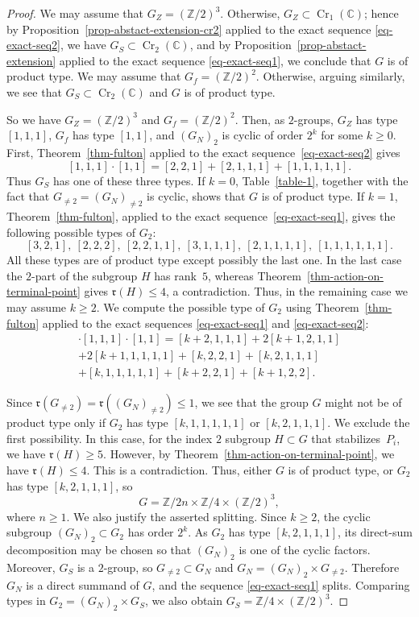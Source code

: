 \documentclass[11pt]{amsart}
\numberwithin{equation}{section}
\theoremstyle{definition}
\theoremstyle{remark}
\DeclareMathOperator{\Cr}{Cr}
\begin{document}
\begin{proof}
We may assume that $G_Z=(\mathbb{Z}/2)^3$. Otherwise, $G_Z\subset \Cr_1(\mathbb{C})$; hence by Proposition~\ref{prop-abstact-extension-cr2} applied to the exact sequence \eqref{eq-exact-seq2}, we have $G_S\subset \Cr_2(\mathbb{C})$, and by Proposition~\ref{prop-abstact-extension} applied to the exact sequence \eqref{eq-exact-seq1}, we conclude that $G$ is of product type. We may assume that $G_f=(\mathbb{Z}/2)^2$. Otherwise, arguing similarly, we see that $G_S\subset \Cr_2(\mathbb{C})$ and $G$ is of product type.

So we have $G_Z=(\mathbb{Z}/2)^3$ and  $G_f=(\mathbb{Z}/2)^2$. Then, as $2$-groups, $G_Z$ has type $[1,1,1]$, $G_f$ has type $[1,1]$, and $(G_N)_2$ is cyclic of order $2^k$ for some $k\geq0$. First, Theorem~\ref{thm-fulton} applied to the exact sequence~\eqref{eq-exact-seq2} gives
\[
[1,1,1]\cdot[1,1]=[2,2,1]+[2,1,1,1]+[1,1,1,1,1].
\]
Thus $G_S$ has one of these three types. If $k=0$, Table~\ref{table-1}, together with the fact that $G_{\neq2}=(G_N)_{\neq2}$ is cyclic, shows that $G$ is of product type. If $k=1$, Theorem~\ref{thm-fulton}, applied to the exact sequence~\eqref{eq-exact-seq1}, gives the following possible types of $G_2$:
\[
[3,2,1],\ [2,2,2],\ [2,2,1,1],\ [3,1,1,1],\ [2,1,1,1,1],\ [1,1,1,1,1,1].
\]
All these types are of product type except possibly the last one. In the last case the $2$-part of the subgroup $H$ has rank~$5$, whereas Theorem~\ref{thm-action-on-terminal-point} gives $\mathfrak r(H)\leq4$, a contradiction. Thus, in the remaining case we may assume $k\geq2$. We compute the possible type of $G_2$ using Theorem~\ref{thm-fulton} applied to the exact sequences \eqref{eq-exact-seq1} and \eqref{eq-exact-seq2}:
\begin{multline*}
[k]\cdot[1,1,1]\cdot[1,1] = [k+2, 1, 1, 1] + 2[k+1, 2, 1, 1] \\+ 2[k+1, 1, 1, 1, 1] + [k, 2, 2, 1] 
+ [k, 2, 1, 1, 1] \\+ [k, 1, 1, 1, 1, 1] + [k+2, 2, 1] + [k+1, 2, 2].
\end{multline*}

Since $\mathfrak{r}(G_{\neq 2})=\mathfrak{r}((G_N)_{\neq 2})\leq 1$, we see that the group $G$ might not be of product type only if $G_2$ has type $[k, 1, 1, 1, 1, 1]$ or $[k, 2, 1, 1, 1]$. 
We exclude the first possibility. In this case, for the index $2$ subgroup $H\subset G$ that stabilizes~$P_i$, we have $\mathfrak{r}(H)\geq 5$. However, by Theorem~\ref{thm-action-on-terminal-point}, we have $\mathfrak{r}(H)\leq 4$. This is a contradiction. Thus, either $G$ is of product type, or $G_2$ has type $[k, 2, 1, 1, 1]$, so
\[
G=\mathbb{Z}/2n\times \mathbb{Z}/4\times (\mathbb{Z}/2)^3, 
\]
where $n\geq 1$. We also justify the asserted splitting. Since $k\geq2$, the cyclic subgroup $(G_N)_2\subset G_2$ has order $2^k$. As $G_2$ has type $[k,2,1,1,1]$, its direct-sum decomposition may be chosen so that $(G_N)_2$ is one of the cyclic factors. Moreover, $G_S$ is a $2$-group, so $G_{\neq2}\subset G_N$ and $G_N=(G_N)_2\times G_{\neq2}$. Therefore $G_N$ is a direct summand of $G$, and the sequence \eqref{eq-exact-seq1} splits. Comparing types in $G_2=(G_N)_2\times G_S$, we also obtain $G_S=\mathbb Z/4\times(\mathbb Z/2)^3$.


\end{proof}
\end{document}
